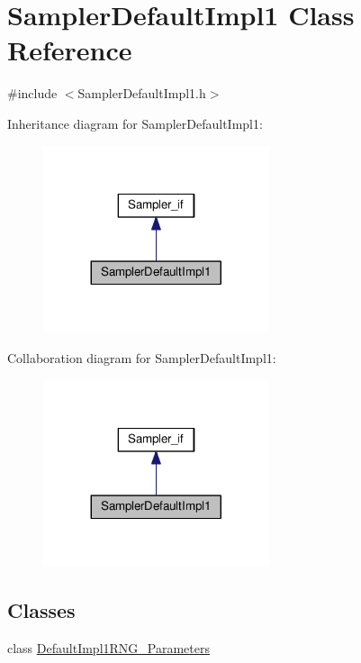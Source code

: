 \hypertarget{class_sampler_default_impl1}{}\section{Sampler\+Default\+Impl1 Class Reference}
\label{class_sampler_default_impl1}


{\ttfamily \#include $<$Sampler\+Default\+Impl1.\+h$>$}



Inheritance diagram for Sampler\+Default\+Impl1\+:\nopagebreak
\begin{figure}[H]
\begin{center}
\leavevmode
\includegraphics[width=188pt]{class_sampler_default_impl1__inherit__graph}
\end{center}
\end{figure}


Collaboration diagram for Sampler\+Default\+Impl1\+:\nopagebreak
\begin{figure}[H]
\begin{center}
\leavevmode
\includegraphics[width=188pt]{class_sampler_default_impl1__coll__graph}
\end{center}
\end{figure}
\subsection*{Classes}
\begin{DoxyCompactItemize}
\item 
class \hyperlink{class_sampler_default_impl1_1_1_default_impl1_r_n_g___parameters}{Default\+Impl1\+R\+N\+G\+\_\+\+Parameters}
\end{DoxyCompactItemize}
